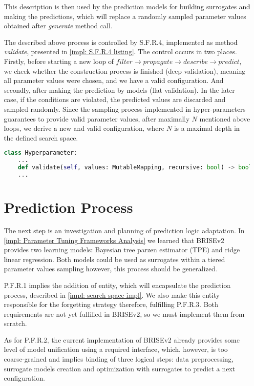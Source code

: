This description is then used by the prediction models for building surrogates and making the predictions, which will replace a randomly sampled parameter values obtained after \emph{generate} method call.

The described above process is controlled by S.F.R.4, implemented as method \emph{validate}, presented in \cref{impl: S.F.R.4 listing}. The control occurs in two places. Firstly, before starting a new loop of $filter \rightarrow propagate \rightarrow describe \rightarrow predict$, we check whether the construction process is finished (deep validation), meaning all parameter values were chosen, and we have a valid configuration. And secondly, after making the prediction by models (flat validation). In the later case, if the conditions are violated, the predicted values are discarded and sampled randomly. Since the sampling process implemented in hyper-parameters guarantees to provide valid parameter values, after maximally $N$ mentioned above loops, we derive a new and valid configuration, where $N$ is a maximal depth in the defined search space.

\begin{lstlisting}[language=Python, caption=S.F.R.4 implementation., label=impl: S.F.R.4 listing]
class Hyperparameter:
	...
	def validate(self, values: MutableMapping, recursive: bool) -> bool: pass
	...
\end{lstlisting}


\section{Prediction Process}\label{impl: prediction logic}
The next step is an investigation and planning of prediction logic adaptation.
In \cref{impl: Parameter Tuning Frameworks Analysis} we learned that BRISEv2 provides two learning models: Bayesian tree parzen estimator (TPE) and ridge linear regression. Both models could be used as surrogates within a tiered parameter values sampling however, this process should be generalized.

P.F.R.1 implies the addition of entity, which will encapsulate the prediction process, described in \cref{impl: search space impl}. We also make this entity responsible for the forgetting strategy therefore, fulfilling P.F.R.3. Both requirements are not yet fulfilled in BRISEv2, so we must implement them from scratch.

As for P.F.R.2, the current implementation of BRISEv2 already provides some level of model unification using a required interface, which, however, is too coarse-grained and implies binding of three logical steps: data preprocessing, surrogate models creation and optimization with surrogates to predict a next configuration.

